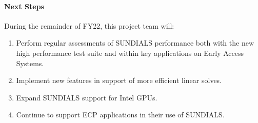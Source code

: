 \paragraph{Next Steps}

During the remainder of FY22, this project team will:
\begin{enumerate}
  \item Perform regular assessments of SUNDIALS performance both with the new
        high performance test suite and within key applications on Early Access
        Systems.
  \item Implement new features in support of more efficient linear solves.
  \item Expand SUNDIALS support for Intel GPUs.
  \item Continue to support ECP applications in their use of SUNDIALS.
\end{enumerate}

